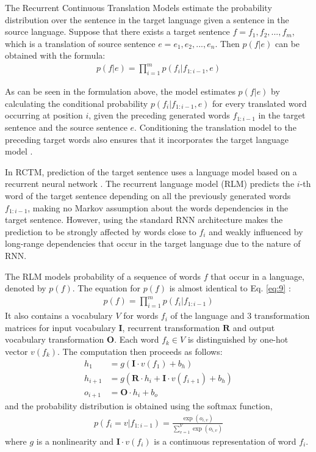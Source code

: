 \documentclass[12pt]{extarticle}
\begin{document}
The Recurrent Continuous Translation Models estimate the probability distribution over the sentence in the target language given a sentence in the source language. Suppose that there exists a target sentence $f = f_{1},f_{2},...,f_{m}$, which is a translation of source sentence $e = e_{1}, e_{2},...,e_{n}$. Then $p(f|e)$ can be obtained with the formula:
\begin{align} \label{eq:9}
p(f|e) = \prod_{i=1}^{m} p(f_{i}|f_{1:i-1}, e)
\end{align}

As can be seen in the formulation above, the model estimates $p(f|e)$ by calculating the conditional probability $p(f_{i}|f_{1:i-1}, e)$ for every translated word occurring at position $i$, given the preceding generated words $f_{1:i-1}$ in the target sentence and the source sentence $e$. Conditioning the translation model to the preceding target words also ensures that it incorporates the target language model \citep{kalchbrenner-blunsom-2013-recurrent-continuous}.

In RCTM, prediction of the target sentence uses a language model based on a recurrent neural network \citep{DBLP:conf/interspeech/MikolovKBCK10}. The recurrent language model (RLM) predicts the $i$-th word of the target sentence depending on all the previously generated words $f_{1:i-1}$, making no Markov assumption about the words dependencies in the target sentence. However, using the standard RNN architecture makes the prediction to be strongly affected by words close to $f_{i}$ and weakly influenced by long-range dependencies that occur in the target language due to the nature of RNN.

The RLM models probability of a sequence of words $f$ that occur in a language, denoted by $p(f)$. The equation for $p(f)$ is almost identical to Eq. \ref{eq:9} :
\begin{align}
p(f) = \prod_{i=1}^{m} p(f_{i}|f_{1:i-1})
\end{align}
It also contains a vocabulary $V$ for words $f_{i}$ of the language and 3 transformation matrices for input vocabulary $\textbf{I}$, recurrent transformation $\textbf{R}$ and output vocabulary transformation $\textbf{O}$. Each word $f_{k} \in V$ is distinguished by one-hot vector $v(f_{k})$. The computation then proceeds as follows: 
\begin{align}
h_{1} &= g(\textbf{I} \cdot v(f_{1}) + b_{h}) \\
h_{i+1} &= g(\textbf{R} \cdot h_{i} + \textbf{I} \cdot v(f_{i+1}) + b_{h}) \\
o_{i+1} &= \textbf{O} \cdot h_{i} + b_{o}
\end{align}
and the probability distribution is obtained using the softmax function, 
\begin{align}
p(f_{i} = v | f_{1:i-1}) = \frac{\exp(o_{i,v})}{\sum_{v=1}^{V}\exp(o_{i,v})}
\end{align}
where $g$ is a nonlinearity and $\textbf{I} \cdot v(f_{i})$ is a continuous representation of word $f_{i}$.
\end{document}
